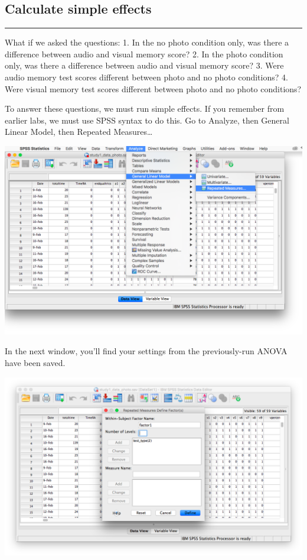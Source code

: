 \documentclass[
]{book}
\begin{document}
\hypertarget{calculate-simple-effects-2}{%
\subsection{Calculate simple effects}\label{calculate-simple-effects-2}}

\begin{center}\rule{0.5\linewidth}{0.5pt}\end{center}

What if we asked the questions:
1. In the no photo condition only, was there a difference between audio and visual memory score?
2. In the photo condition only, was there a difference between audio and visual memory score?
3. Were audio memory test scores different between photo and no photo conditions?
4. Were visual memory test scores different between photo and no photo conditions?

To answer these questions, we must run simple effects. If you remember from earlier labs, we must use SPSS syntax to do this. Go to {Analyze}, then {General Linear Model}, then {Repeated Measures\ldots{}}

\includegraphics{img/11.4.20.png}

In the next window, you'll find your settings from the previously-run ANOVA have been saved.

\includegraphics{img/11.4.21.png}
\end{document}
